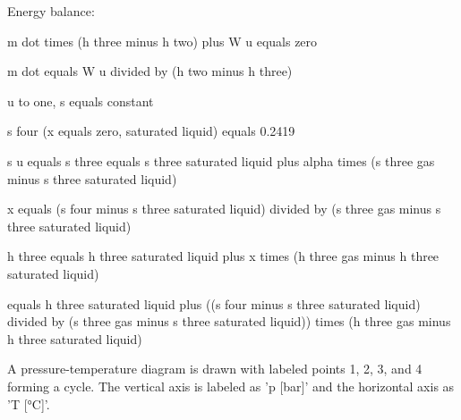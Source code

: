 Energy balance:  

m dot times (h three minus h two) plus W u equals zero  

m dot equals W u divided by (h two minus h three)  

u to one, s equals constant  

s four (x equals zero, saturated liquid) equals 0.2419  

s u equals s three equals s three saturated liquid plus alpha times (s three gas minus s three saturated liquid)  

x equals (s four minus s three saturated liquid) divided by (s three gas minus s three saturated liquid)  

h three equals h three saturated liquid plus x times (h three gas minus h three saturated liquid)  

equals h three saturated liquid plus ((s four minus s three saturated liquid) divided by (s three gas minus s three saturated liquid)) times (h three gas minus h three saturated liquid)

A pressure-temperature diagram is drawn with labeled points 1, 2, 3, and 4 forming a cycle. The vertical axis is labeled as 'p [bar]' and the horizontal axis as 'T [°C]'.